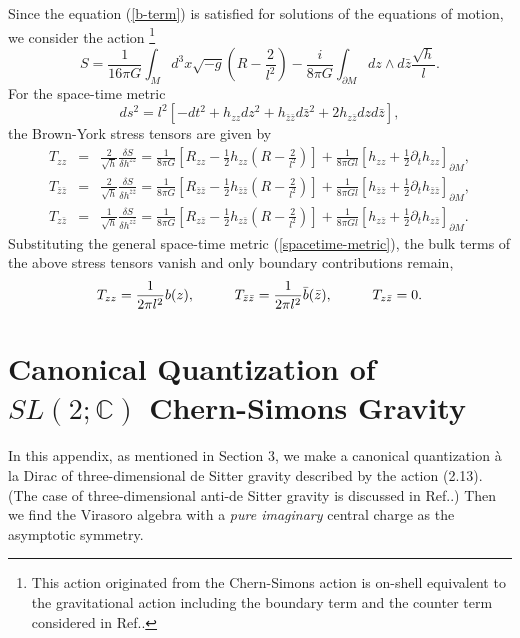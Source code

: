 \documentclass[a4paper,11pt]{article}
\begin{document}
Since the equation (\ref{b-term}) is satisfied for solutions of 
the equations of motion, we consider the action
\footnote{This action originated from the Chern-Simons action is
on-shell equivalent to the gravitational action including the boundary
term and the counter term considered in Ref.\cite{Brown-York,
Strominger, BBM1}.} 
\begin{equation}
S=\frac{1}{16\pi G}\int_M d^3x \sqrt{-g}\left(R-\frac{2}{l^2}\right)
       -\frac{i}{8\pi G}\int_{\partial M}dz\wedge d\bar{z}
        \frac{\sqrt{h}}{l}.
\end{equation}
For the space-time metric
\begin{equation}
ds^2=l^2\left[-dt^2+h_{zz}dz^2+h_{\bar{z}\bar{z}}d\bar{z}^2
   +2h_{z\bar{z}}dzd\bar{z}\right],
\end{equation}
the Brown-York stress tensors are given by 
\begin{eqnarray}
 T_{zz} &=& \frac{2}{\sqrt{h}}\frac{\delta S}{\delta h^{zz}}
   = \frac{1}{8\pi G}\left[R_{zz}-\frac{1}{2}h_{zz}
      \left(R-\frac{2}{l^2}\right)\right]
       +\frac{1}{8\pi Gl}\left[h_{zz}
         +\frac{1}{2}\partial_t h_{zz}\right]_{\partial M}, \\
 T_{\bar{z}\bar{z}} &=& 
  \frac{2}{\sqrt{h}}\frac{\delta S}{\delta h^{\bar{z}\bar{z}}}
   = \frac{1}{8\pi G}\left[R_{\bar{z}\bar{z}}-\frac{1}{2}h_{\bar{z}\bar{z}}
      \left(R-\frac{2}{l^2}\right)\right]
       +\frac{1}{8\pi Gl}\left[h_{\bar{z}\bar{z}}
         +\frac{1}{2}\partial_t h_{\bar{z}\bar{z}}\right]_{\partial M}, \\
T_{z\bar{z}} &=& \frac{1}{\sqrt{h}}\frac{\delta S}{\delta h^{z\bar{z}}}
   = \frac{1}{8\pi G}\left[R_{z\bar{z}}-\frac{1}{2}h_{z\bar{z}}
      \left(R-\frac{2}{l^2}\right)\right]
       +\frac{1}{8\pi Gl}\left[h_{z\bar{z}}
         +\frac{1}{2}\partial_t h_{z\bar{z}}\right]_{\partial M}.
\end{eqnarray}
Substituting the general space-time metric (\ref{spacetime-metric}), 
the bulk terms of the above stress tensors vanish and only boundary 
contributions remain,
\begin{eqnarray}
 T_{zz}=\frac{1}{2\pi l^2}b(z), \hspace{10mm}
 T_{\bar{z}\bar{z}}=\frac{1}{2\pi l^2} \bar{b}(\bar{z}), \hspace{10mm}
 T_{z\bar{z}}=0.
\end{eqnarray}


\section{Canonical Quantization of $SL(2;\mathbb{C})$ Chern-Simons Gravity}
In this appendix, as mentioned in Section 3, we make a canonical
quantization \`a la Dirac of three-dimensional de Sitter gravity 
described by the action (2.13). (The case of three-dimensional 
anti-de Sitter gravity is discussed in Ref.\cite{Banados2, B-B-O, 
Oh, Park2, Banados1}.)    
Then we find the Virasoro algebra
with a {\it pure imaginary} central charge as the asymptotic symmetry.
\end{document}
